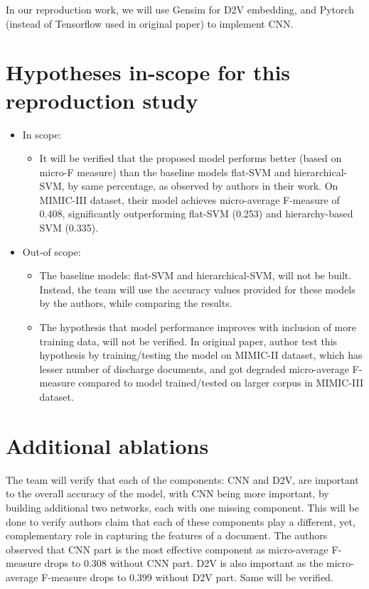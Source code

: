 \documentclass[11pt,a4paper]{article}
\begin{document}
In our reproduction work, we will use Gensim for D2V embedding, and Pytorch (instead of Tensorflow used in original paper) to implement CNN.

\section{Hypotheses in-scope for this reproduction study}
\begin{itemize}
    \item In scope:
    		\begin{itemize}
        		\item It will be verified that the proposed model performs better (based on micro-F measure) than the baseline models flat-SVM and hierarchical-SVM, by same percentage, as observed by authors in their work. On MIMIC-III dataset, their model achieves micro-average F-measure of 0.408, significantly outperforming flat-SVM (0.253) and hierarchy-based SVM (0.335).
        \end{itemize}

    \item Out-of scope:
    		\begin{itemize}
        		\item The baseline models: flat-SVM and hierarchical-SVM, will not be built. Instead, the team  will use the accuracy values provided for these models by the authors, while comparing the results.
        		\item The hypothesis that model performance improves with inclusion of more training data, will not be verified. In original paper, author test this hypothesis by training/testing the model on MIMIC-II dataset, which has lesser number of discharge documents, and got degraded micro-average F-measure compared to model trained/tested on larger corpus in MIMIC-III dataset.
        	\end{itemize}
\end{itemize}

\section{Additional ablations}
The team will verify that each of the components: CNN and D2V, are important to the overall accuracy of the model, with CNN being more important, by building additional two networks, each with one missing component. This will be done to verify authors claim that each of these components play a different, yet, complementary role in capturing the features of a document. The authors observed that CNN part is the most effective component as micro-average F-measure drops to 0.308 without CNN part. D2V is also important as the micro-average F-measure drops to 0.399 without D2V part. Same will be verified.
\end{document}
